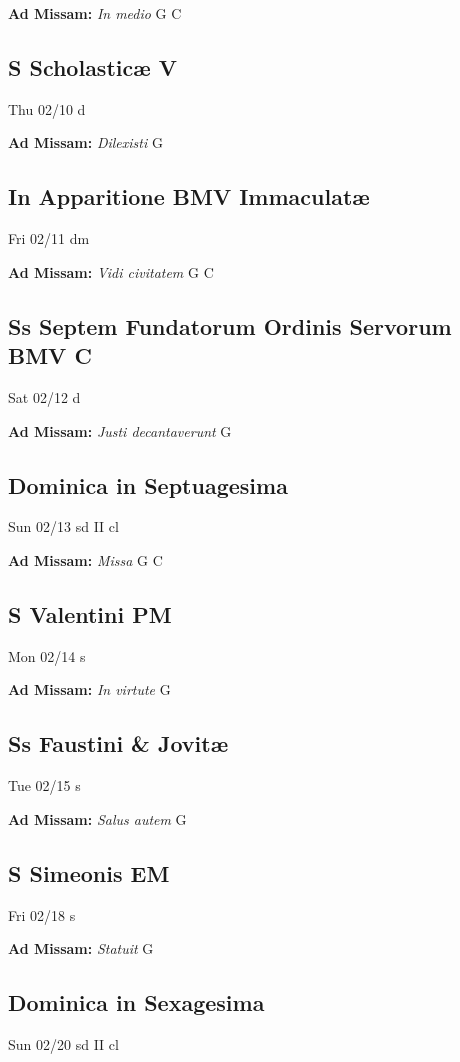 \documentclass[letterpaper, 10pt, twocolumn]{article}
\begin{document}
\textbf{Ad Missam:} \textit{In medio} G C 

\subsection*{S Scholasticæ V}Thu 02/10 d

\textbf{Ad Missam:} \textit{Dilexisti} G 

\subsection*{In Apparitione BMV Immaculatæ}Fri 02/11 dm

\textbf{Ad Missam:} \textit{Vidi civitatem} G C 

\subsection*{Ss Septem Fundatorum Ordinis Servorum BMV C}Sat 02/12 d

\textbf{Ad Missam:} \textit{Justi decantaverunt} G 

\subsection*{Dominica in Septuagesima}Sun 02/13 sd II cl

\textbf{Ad Missam:} \textit{Missa} G C 

\subsection*{S Valentini PM}Mon 02/14 s

\textbf{Ad Missam:} \textit{In virtute} G 

\subsection*{Ss Faustini \& Jovitæ}Tue 02/15 s

\textbf{Ad Missam:} \textit{Salus autem} G 

\subsection*{S Simeonis EM}Fri 02/18 s

\textbf{Ad Missam:} \textit{Statuit} G 

\subsection*{Dominica in Sexagesima}Sun 02/20 sd II cl
\end{document}
